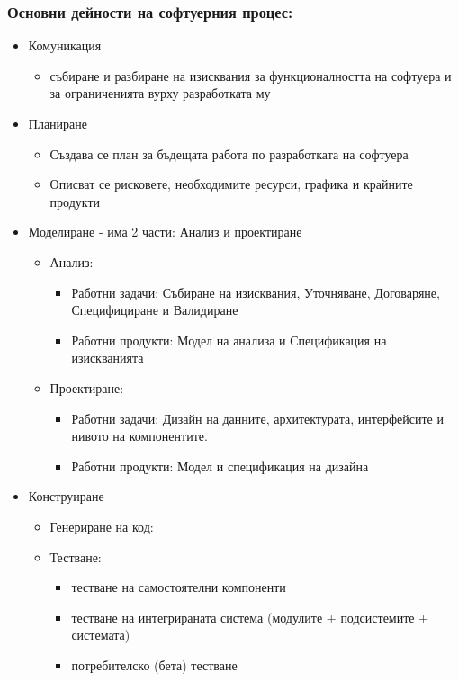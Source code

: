 \documentclass[fleqn,12pt]{article}
\begin{document}
\subsubsection{Основни дейности на софтуерния процес:}
\begin{itemize}
	
	\item Комуникация
	\begin{itemize}
		\item събиране и разбиране на изисквания за функционалността на софтуера и за ограниченията вурху разработката му
	\end{itemize}
	
	\item Планиране
	\begin{itemize}
		\item Създава се план за бъдещата работа по разработката на софтуера
		\item Описват се рисковете, необходимите ресурси, графика и крайните продукти
	\end{itemize}
	
	\item Моделиране - има 2 части: Анализ и проектиране
	\begin{itemize}
		\item Анализ:
		\begin{itemize}
			\item Работни задачи: Събиране на изисквания, Уточняване, Договаряне, Специфициране и Валидиране
			\item Работни продукти: Модел на анализа и Спецификация на изискванията
		\end{itemize}
		
		\item Проектиране:
		\begin{itemize}
			\item Работни задачи: Дизайн на данните, архитектурата, интерфейсите и нивото на компонентите.
			\item Работни продукти: Модел и спецификация на дизайна
		\end{itemize}
	\end{itemize}

	\item Конструиране
	\begin{itemize}
		\item Генериране на код:
		\item Тестване:
		\begin{itemize}
			\item тестване на самостоятелни компоненти
			\item тестване на интегрираната система (модулите + подсистемите + системата)
			\item потребителско (бета) тестване
		\end{itemize}
	\end{itemize}


\end{itemize}
\end{document}

